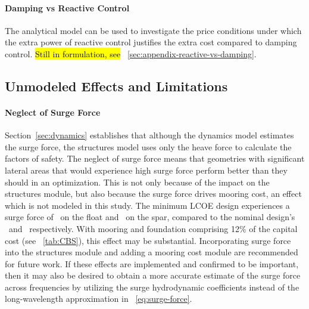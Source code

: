 \paragraph{Damping vs Reactive Control}
The analytical model can be used to investigate the price conditions under which the extra power of reactive control justifies the extra cost compared to damping control.
\hl{Still in formulation, see} \appendixautorefname~\ref{sec:appendix-reactive-vs-damping}.


\subsection{Unmodeled Effects and Limitations}
\paragraph{Neglect of Surge Force}
Section~\ref{sec:dynamics} establishes that although the dynamics model estimates the surge force, the structures model uses only the heave force to calculate the factors of safety.
The neglect of surge force means that geometries with significant lateral areas that would experience high surge force perform better than they should in an optimization.
This is not only because of the impact on the structures module, but also because the surge force drives mooring cost, an effect which is not modeled in this study.
The minimum LCOE design experiences a surge force of \surgeForceFloatAtMinLCOE~on the float and \surgeForceSparAtMinLCOE~on the spar, compared to the nominal design's \surgeForceFloatNominal~and \surgeForceSparNominal~respectively.
With mooring and foundation comprising 12\% of the capital cost (see \tableautorefname~\ref{tab:CBS}), this effect may be substantial.
Incorporating surge force into the structures module and adding a mooring cost module are recommended for future work.
If these effects are implemented and confirmed to be important, then it may also be desired to obtain a more accurate estimate of the surge force across frequencies by utilizing the surge hydrodynamic coefficients instead of the long-wavelength approximation in \equationautorefname~\ref{eq:surge-force}. 

